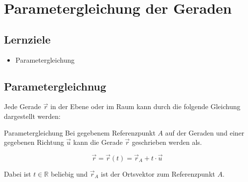 \section{Parametergleichung der Geraden}

\subsection*{Lernziele}
\begin{itemize}
\item Parametergleichung
\end{itemize}



\theorieTALSGeom{}{}
\newpage

\subsection{Parametergleichnug}
Jede Gerade $\vec{r}$ in der Ebene oder im Raum kann durch die
folgende Gleichung dargestellt werden:

\begin{definition}{Parametergleichung}{}
  Bei gegebenem Referenzpunkt $A$ auf der Geraden und einer gegebenen
  Richtung $\vec{u}$ kann die Gerade $\vec{r}$ geschrieben werden als.
  
  $$\vec{r} = \vec{r}(t) = \vec{r}_A + t\cdot{} \vec{u}$$

  Dabei ist $t\in\mathbb{R}$ beliebig und $\vec{r}_A$ ist der
  Ortsvektor zum Referenzpunkt $A$.
\end{definition}

